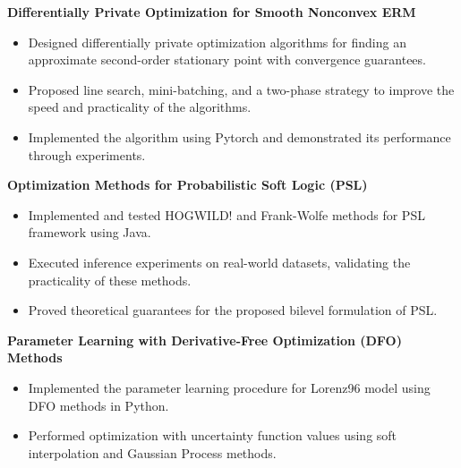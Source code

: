 \documentclass[letterpaper,12pt]{article}
\newcommand{\resumeSubheadingTitleOnly}[1]{
  \vspace{-1pt}\item
    \textbf{#1}
  \vspace{-5pt}
}
\begin{document}
\resumeSubheadingTitleOnly{Differentially Private Optimization for Smooth Nonconvex ERM}
  \begin{itemize}
    \item Designed differentially private optimization algorithms for finding an approximate second-order stationary point with convergence guarantees.
    \item Proposed line search, mini-batching, and a two-phase strategy to improve the speed and practicality of the algorithms.
    \item Implemented the algorithm using Pytorch and demonstrated its performance through experiments.
  \end{itemize}



\resumeSubheadingTitleOnly{Optimization Methods for Probabilistic Soft Logic (PSL)}
  \begin{itemize}
    \item Implemented and tested HOGWILD! and Frank-Wolfe methods for PSL framework using Java.
    \item Executed inference experiments on real-world datasets, validating the practicality of these methods.
    \item Proved theoretical guarantees for the proposed bilevel formulation of PSL.
  \end{itemize}


\resumeSubheadingTitleOnly{Parameter Learning with Derivative-Free Optimization (DFO) Methods}
  \begin{itemize}
    \item Implemented the parameter learning procedure for Lorenz96 model using DFO methods in Python.
    \item Performed optimization with uncertainty function values using soft interpolation and Gaussian Process methods.
  \end{itemize}
\end{document}
